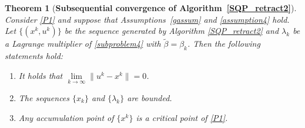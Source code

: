 \documentclass[10pt]{article}
\numberwithin{equation}{section}
\newtheorem{theorem}{Theorem}[section]
\begin{document}
\begin{theorem}[{{\bf Subsequential convergence of Algorithm~\ref{SQP_retract2}}}]\label{convergence3}
Consider \eqref{P1} and suppose that Assumptions~\ref{gassum} and \ref{assumption4} hold. Let {\color{blue}$\{(x^k,u^k)\}$} be the sequence generated by Algorithm \ref{SQP_retract2} and $\lambda_k$ be a Lagrange multiplier of \eqref{subproblem4} with $\widetilde{\beta} = \beta_k$.  Then the following statements hold:
\begin{enumerate}[{\rm(i)}]
  \item It holds that $\lim\limits_{k\rightarrow\infty}\|u^k - x^k\| = 0$.
  \item The sequences $\{x_k\}$ and $\{\lambda_k\}$ are bounded.
  \item Any accumulation point of $\{x^k\}$ is a {\color{blue}critical point} of \eqref{P1}.
\end{enumerate}
\end{theorem}
%
\end{document}
